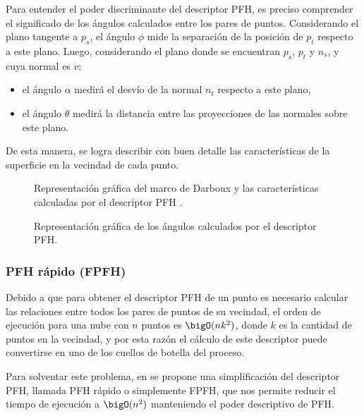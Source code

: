 Para entender el poder discriminante del descriptor PFH, es preciso comprender el significado
de los ángulos calculados entre los pares de puntos.
Considerando el plano tangente a $p_s$, el ángulo $\phi$ mide la separación de la posición de $p_t$ respecto a este plano.
Luego, considerando el plano donde se encuentran $p_s$, $p_t$ y $n_s$, y cuya normal es $v$:
\begin{itemize}
	\item el ángulo $\alpha$ medirá el desvío de la normal $n_t$ respecto a este plano,
	\item el ángulo $\theta$ medirá la distancia entre las proyecciones de las normales sobre este plano.
\end{itemize}
De esta manera, se logra describir con buen detalle las características de la superficie en la vecindad de cada punto.



\begin{figure}
	\caption{\label{fig:pfh_marco_referencia}Representación gráfica del marco de Darboux y las características calculadas por el descriptor PFH .}
\end{figure}

\begin{figure}
	\caption{\label{fig:pfh_angulos}Representación gráfica de los ángulos calculados por el descriptor PFH.}
\end{figure}

\subsubsection{PFH rápido (FPFH)}
Debido a que para obtener el descriptor PFH de un punto es necesario calcular
las relaciones entre todos los pares de puntos de su vecindad,
el orden de ejecución para una nube con $n$ puntos es $\bigO(nk^2)$,
donde $k$ es la cantidad de puntos en la vecindad,
y por esta razón el cálculo de este descriptor puede convertirse
en uno de los cuellos de botella del proceso.

Para solventar este problema, en \cite{Rusu:2009:FPF:1703435.1703733} se propone
una simplificación del descriptor PFH, llamada PFH rápido o simplemente FPFH,
que nos permite reducir el tiempo de ejecución a $\bigO(n^2)$
manteniendo el poder descriptivo de PFH.

